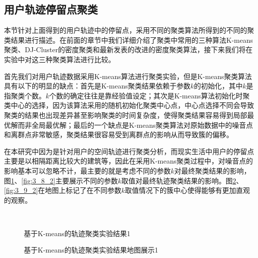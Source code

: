 \subsection{用户轨迹停留点聚类}
\label{traclustar}
本节针对上面得到的用户轨迹中的停留点，采用不同的聚类算法所得到的不同的聚类结果进行描述。在前面的章节中我们详细介绍了聚类中常用的三种算法K-means聚类、DJ-Cluster的密度聚类和最新发表的改进的密度聚类算法，接下来我们将在实验中对这三种聚类算法进行比较。
\par 首先我们对用户轨迹数据采用K-means算法进行聚类实验，但是K-means聚类算法具有以下的明显的缺点：首先是K-means聚类结果依赖于参数$k$的初始化，其中$k$是指聚类个数。$k$个数的确定往往是靠经验值设定；其次是K-means算法初始化时聚类中心的选择，因为该算法采用的随机初始化聚类中心点，中心点选择不同会导致聚类的结果也出现差异甚至影响聚类的时间复杂度，使得聚类结果容易得到局部最优解而非全局最优解；最后的一个缺点是K-means聚类算法对原始数据中的噪音点和离群点非常敏感，聚类结果很容易受到离群点的影响从而导致簇的偏移。
\par 在本研究中因为是针对用户的空间轨迹进行聚类分析，而现实生活中用户的停留点主要是以相隔距离比较大的建筑等，因此在采用K-means聚类过程中，对噪音点的影响基本可以忽略不计，最主要的就是考虑不同的参数$k$对最终聚类结果的影响，图\ref{fig:3_8_1}、\ref{fig:3_8_2}主要展示不同的参数$k$取值对最终轨迹聚类结果的影响。图\ref{fig:3_9_1}、\ref{fig:3_9_2}在地图上标记了在不同参数$k$取值情况下的簇中心使得能够有更加直观的观察。
\begin{figure}[htb]
  \centering%
  \\
  \caption{基于K-means的轨迹聚类实验结果1}
  \label{fig:3_8_1}
\end{figure}
\begin{figure}[htb]
  \centering%
  \caption{基于K-means的轨迹聚类实验结果地图展示1}
  \label{fig:3_9_1}
\end{figure}
